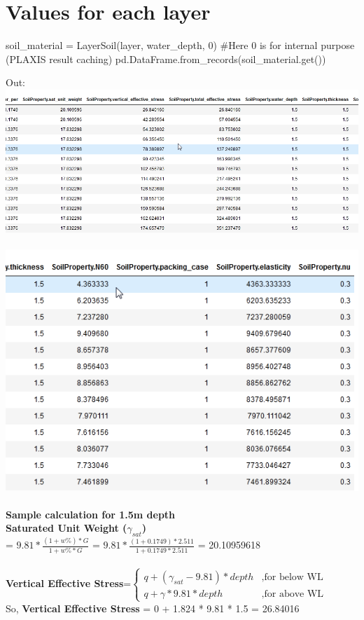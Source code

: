\section{Values for each layer}
\begin{python}
soil_material = LayerSoil(layer, water_depth, 0)
#Here 0 is for internal purpose (PLAXIS result caching)
pd.DataFrame.from_records(soil_material.get())
\end{python}
Out:\\
\includegraphics[width=\linewidth,keepaspectratio]{./images/sample/l1.png}\\\\
\includegraphics[width=\linewidth,keepaspectratio]{./images/sample/l2.png}\\\\

\textbf{Sample calculation for 1.5m depth}\\

\textbf{Saturated Unit Weight ($\gamma_{sat}$)}\\
= $9.81*\frac{(1+w\%)* G }{ 1+ w\% * G}$
= $9.81*\frac{(1+0.1749)*2.511}{1+0.1749*2.511}$
= 20.10959618\\\\
\textbf{Vertical Effective Stress}=$
\begin{cases}
q + (\gamma_{sat} - 9.81)*depth & ,\text{for below WL}\\
q + \gamma * 9.81 * depth & ,\text{for above WL}
\end{cases}
$\\
So, \textbf{Vertical Effective Stress} = 0 + 1.824 * 9.81 * 1.5 = 26.84016\\

